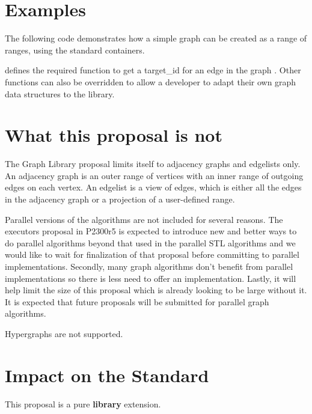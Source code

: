 \section{Examples}


The following code demonstrates how a simple graph can be created as a range of ranges, using the standard containers. 


{\small
  
}

 defines the required function to get a target\_id for an edge in the graph . Other functions can also
be overridden to allow a developer to adapt their own graph data structures to the library.

\section{What this proposal is  \textbf{not}}

The Graph Library proposal limits itself to adjacency graphs and edgelists only. An adjacency graph is an outer range of vertices with an inner range of outgoing
edges on each vertex. An edgelist is a view of edges, which is either all the edges in the adjacency graph or a projection of a user-defined range.

Parallel versions of the algorithms are not included for several reasons. The executors proposal in P2300r5 \cite{REF_P2300r5} is expected to introduce new 
and better ways to do parallel algorithms beyond that used in the parallel STL algorithms and we would like to wait for finalization of that proposal before 
committing to parallel implementations. Secondly, many graph algorithms don't benefit from parallel implementations so there is less need to offer an implementation. 
Lastly, it will help limit the size of this proposal which is already looking to be large without it. It is expected that future proposals will be submitted for parallel graph algorithms. 

Hypergraphs are not supported.

\section{Impact on the Standard}
This proposal is a pure \textbf{library} extension.

